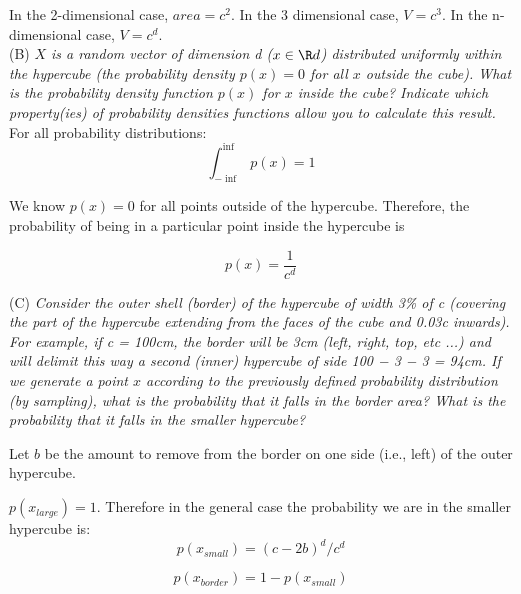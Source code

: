 \documentclass{amsart}
\theoremstyle{definition}
\theoremstyle{remark}
\numberwithin{equation}{section}
\begin{document}
In the 2-dimensional case, $area = c^2$. In the 3 dimensional case, $V = c^3$. 
In the n-dimensional case, $V = c^d$. \\

(B) \textit{$X$ is a random vector of dimension d ($x \in \R d$) distributed 
uniformly within the hypercube (the probability density  $p(x) = 0$ for all $x$ 
outside the cube). What is the probability density function $p(x)$ for $x$ inside 
the cube? Indicate which property(ies) of probability densities functions allow 
you to calculate this result.}\\

For all probability distributions: \\

\begin{equation}
    \int_{-\inf}^{\inf}p(x) = 1
\end{equation}

We know $p(x) = 0$ for all points outside of the hypercube. Therefore,
the probability of being in a particular point inside the hypercube is

\begin{equation}
    p(x) = \frac{1}{c^d}
\end{equation}

(C) \textit{Consider the outer shell (border) of the hypercube of width 
3\% of c (covering the part of the hypercube extending from the faces of 
the cube and 0.03c inwards). For example, if c = 100cm, the border will
be 3cm (left, right, top, etc ...) and will delimit this way a second
(inner) hypercube of side 100 − 3 − 3 = 94cm. If we generate a point $x$
according to the previously defined probability distribution (by 
sampling), what is the probability that it falls in the border area? What
is the probability that it falls in the smaller hypercube?}

Let $b$ be the amount to remove from the border on one side (i.e., left) 
of the outer hypercube.

$p(x_{large}) = 1$. Therefore in the general case the probability we are in the smaller hypercube is:\\

\begin{equation}
    p(x_{small}) = (c-2b)^d / c^d
\end{equation}

\begin{equation}
    p(x_{border}) = 1 - p(x_{small})
\end{equation}
\end{document}
